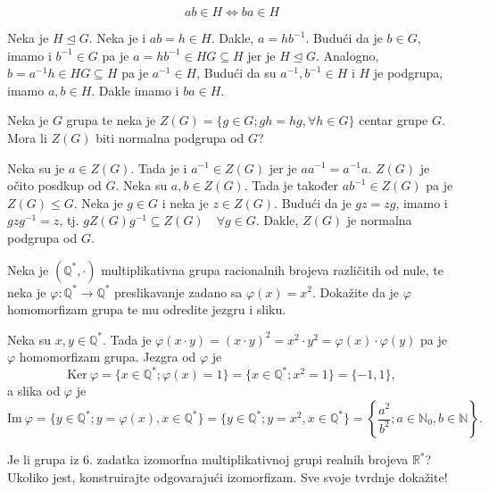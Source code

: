 \documentclass{exam}
\begin{document}
\begin{questions}
\[
  ab \in H \iff ba \in H
\]

\begin{solution}
  Neka je $H \trianglelefteq G$. Neka je i $ab = h \in H$. Dakle, $a = hb^{-1}$. Budući da je $b \in G$, imamo i $b^{-1} \in G$ pa je $a = hb^{-1} \in HG \subseteq H$ jer je $H \trianglelefteq G$. Analogno, $b = a^{-1}h \in HG \subseteq H$ pa je $a^{-1} \in H$, Budući da su $a^{-1}, b^{-1} \in H$ i $H$ je podgrupa, imamo $a, b \in H$. Dakle imamo i $ba \in H$.
\end{solution}

\question Neka je $G$ grupa te neka je $Z(G) = \{g \in G; gh = hg, \forall h \in G\}$ centar grupe $G$. Mora li $Z(G)$ biti normalna podgrupa od $G$?

\begin{solution}
  Neka su je $a \in Z(G)$. Tada je i $a^{-1} \in Z(G)$ jer je $a a^{-1} = a^{-1}a$. $Z(G)$ je očito posdkup od $G$. Neka su $a, b \in Z(G)$. Tada je također $a b^{-1} \in Z(G)$ pa je $Z(G) \leq G$. Neka je $g \in G$ i neka je $z \in Z(G)$. Budući da je $gz = zg$, imamo i $g z g^{-1} = z$, tj. $g Z(G) g^{-1} \subseteq Z(G) \quad \forall g \in G$. Dakle, $Z(G)$ je normalna podgrupa od $G$.
\end{solution}

\question Neka je $(\mathbb{Q}^*, \cdot)$ multiplikativna grupa racionalnih brojeva različitih od nule, te neka je $\varphi: \mathbb{Q}^* \rightarrow \mathbb{Q}^*$ preslikavanje zadano sa $\varphi(x) = x^2$. Dokažite da je $\varphi$ homomorfizam grupa te mu odredite jezgru i sliku.

\begin{solution}
  Neka su $x, y \in \mathbb{Q}^*$. Tada je
  $\varphi(x \cdot y) = (x \cdot y)^2 = x^2 \cdot y^2 = \varphi(x) \cdot \varphi(y)$ pa je $\varphi$ homomorfizam grupa. Jezgra od $\varphi$ je
  \[
    \text{Ker}\ \varphi = \{x \in \mathbb{Q}^*; \varphi(x) = 1\} = \{x \in \mathbb{Q}^*; x^2 = 1\} = \{-1, 1\},
  \]
  a slika od $\varphi$ je
  \[
    \text{Im}\ \varphi = \{y \in \mathbb{Q}^*; y = \varphi(x), x \in \mathbb{Q}^*\} = \{y \in \mathbb{Q}^*; y = x^2, x \in \mathbb{Q}^*\} = \left\{ \frac{a^2}{b^2}; a \in \mathbb{N}_0, b \in \mathbb{N} \right\}.
  \]
\end{solution}

\question Je li grupa iz 6. zadatka izomorfna multiplikativnoj grupi realnih brojeva $\mathbb{R}^*$? Ukoliko jest, konstruirajte odgovarajući izomorfizam. Sve svoje tvrdnje dokažite!


\end{questions}
\end{document}
